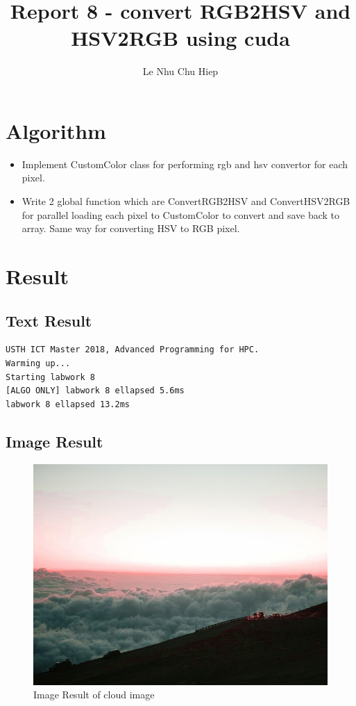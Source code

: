 \documentclass{article}
\title{Report 8 - convert RGB2HSV and HSV2RGB using cuda}
\author{Le Nhu Chu Hiep}
\begin{document}
\maketitle
\section{Algorithm}
\begin{itemize}
        \item Implement CustomColor class for performing rgb and hsv convertor for each pixel.
        \item Write 2 global function which are ConvertRGB2HSV and ConvertHSV2RGB for parallel loading each pixel to CustomColor to convert and save back to array. Same way for converting HSV to RGB pixel.
\end{itemize}

\newpage
\section{Result}
\subsection{Text Result}
\begin{verbatim}
USTH ICT Master 2018, Advanced Programming for HPC.
Warming up...
Starting labwork 8
[ALGO ONLY] labwork 8 ellapsed 5.6ms
labwork 8 ellapsed 13.2ms
\end{verbatim}

\subsection{Image Result}
\begin{figure}[h]
    \centering
    \includegraphics[width=\textwidth]{./labwork8-gpu-out.jpg}
    \caption{Image Result of cloud image}
\end{figure}
\end{document}
